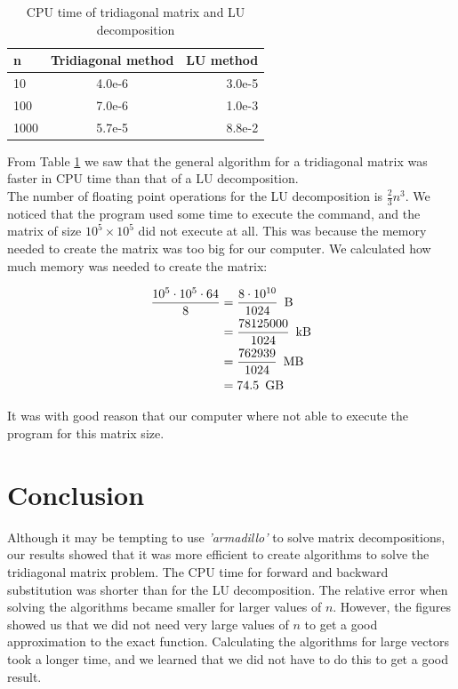 \documentclass[12pt]{article}
\begin{document}
\begin{table}[H]
    \centering
    \begin{tabular}{ l | c | r }
        n & Tridiagonal method & LU method \\ \hline
        10 & 4.0e-6 & 3.0e-5 \\
        100 & 7.0e-6 & 1.0e-3 \\
        1000 & 5.7e-5& 8.8e-2 \\
    \end{tabular}
    \caption{CPU time of tridiagonal matrix and LU decomposition}
    \label{tab:LU}
\end{table}

\noindent From Table \ref{tab:LU} we saw that the general algorithm for a tridiagonal matrix was faster in CPU time than that of a LU decomposition. \\

\noindent The number of floating point operations for the LU decomposition is $\frac{2}{3}n^3$\citep{LU}. We noticed that the program used some time to execute the command, and the matrix of size $10^5 \times 10^5$ did not execute at all. This was because the memory needed to create the matrix was too big for our computer. We calculated how much memory was needed to create the matrix:

\begin{align*}
    \frac{10^5 \cdot 10^5 \cdot 64}{8} &= \frac{8 \cdot 10^{10}}{1024} \enskip \text{B} \\
    &= \frac{78125000}{1024} \enskip \text{kB} \\
    &= \frac{762939}{1024} \enskip \text{MB} \\
    &= 74.5 \enskip \text{GB}
\end{align*}

\noindent It was with good reason that our computer where not able to execute the program for this matrix size.




\section{Conclusion}

\noindent Although it may be tempting to use \textit{'armadillo'} to solve matrix decompositions, our results showed that it was more efficient to create algorithms to solve the tridiagonal matrix problem. The CPU time for forward and backward substitution was shorter than for the LU decomposition. The relative error when solving the algorithms became smaller for larger values of $n$. However, the figures showed us that we did not need very large values of $n$ to get a good approximation to the exact function. Calculating the algorithms for large vectors took a longer time, and we learned that we did not have to do this to get a good result. \\
\end{document}
